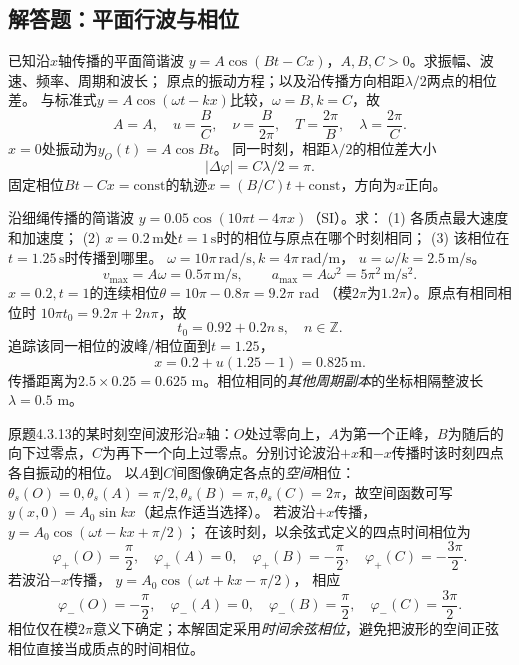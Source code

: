 \subsection{解答题：平面行波与相位}

\problemtext 已知沿$x$轴传播的平面简谐波
$y=A\cos(Bt-Cx)$，$A,B,C>0$。求振幅、波速、频率、周期和波长；
原点的振动方程；以及沿传播方向相距$\lambda/2$两点的相位差。
\workings
与标准式$y=A\cos(\omega t-kx)$比较，$\omega=B,k=C$，故
\[
\boxed{A=A,\quad u=\frac BC,\quad
\nu=\frac B{2\pi},\quad T=\frac{2\pi}{B},\quad
\lambda=\frac{2\pi}{C}}.
\]
$x=0$处振动为$\boxed{y_O(t)=A\cos Bt}$。
同一时刻，相距$\lambda/2$的相位差大小
\[
\boxed{|\Delta\varphi|=C\lambda/2=\pi}.
\]
\crosscheck 固定相位$Bt-Cx=\mathrm{const}$的轨迹$x=(B/C)t+\mathrm{const}$，方向为$x$正向。

\problemtext 沿细绳传播的简谐波
$y=0.05\cos(10\pi t-4\pi x)$（SI）。求：
(1) 各质点最大速度和加速度；
(2) $x=0.2\,\mathrm m$处$t=1\,\mathrm s$时的相位与原点在哪个时刻相同；
(3) 该相位在$t=1.25\,\mathrm s$时传播到哪里。
\workings
$\omega=10\pi\,\mathrm{rad/s},k=4\pi\,\mathrm{rad/m}$，
$u=\omega/k=2.5\,\mathrm{m/s}$。
\[
\boxed{v_{\max}=A\omega=0.5\pi\,\mathrm{m/s}},\qquad
\boxed{a_{\max}=A\omega^2=5\pi^2\,\mathrm{m/s^2}}.
\]
$x=0.2,t=1$的连续相位$\theta=10\pi-0.8\pi=9.2\pi$ rad
（模$2\pi$为$1.2\pi$）。原点有相同相位时
$10\pi t_0=9.2\pi+2n\pi$，故
\[
\boxed{t_0=0.92+0.2n\ \mathrm s,\quad n\in\mathbb Z}.
\]
追踪该同一相位的波峰/相位面到$t=1.25$，
\[
\boxed{x=0.2+u(1.25-1)=0.825\,\mathrm m}.
\]
\crosscheck 传播距离为$2.5\times0.25=0.625$ m。相位相同的\emph{其他周期副本}的坐标相隔整波长$\lambda=0.5$ m。

\problemtext 原题4.3.13的某时刻空间波形沿$x$轴：$O$处过零向上，$A$为第一个正峰，$B$为随后的向下过零点，$C$为再下一个向上过零点。分别讨论波沿$+x$和$-x$传播时该时刻四点各自振动的相位。
\workings
以$A$到$C$间图像确定各点的\emph{空间}相位：
$\theta_s(O)=0,\theta_s(A)=\pi/2,\theta_s(B)=\pi,\theta_s(C)=2\pi$，故空间函数可写$y(x,0)=A_0\sin kx$（起点作适当选择）。
若波沿$+x$传播，
$y=A_0\cos(\omega t-kx+\pi/2)$；
在该时刻，以余弦式定义的四点时间相位为
\[
\boxed{\varphi_+(O)=\frac\pi2,\quad
\varphi_+(A)=0,\quad
\varphi_+(B)=-\frac\pi2,\quad
\varphi_+(C)=-\frac{3\pi}{2}}.
\]
若波沿$-x$传播，
$y=A_0\cos(\omega t+kx-\pi/2)$，
相应
\[
\boxed{\varphi_-(O)=-\frac\pi2,\quad
\varphi_-(A)=0,\quad
\varphi_-(B)=\frac\pi2,\quad
\varphi_-(C)=\frac{3\pi}{2}}.
\]
\crosscheck 相位仅在模$2\pi$意义下确定；本解固定采用\emph{时间余弦相位}，避免把波形的空间正弦相位直接当成质点的时间相位。

